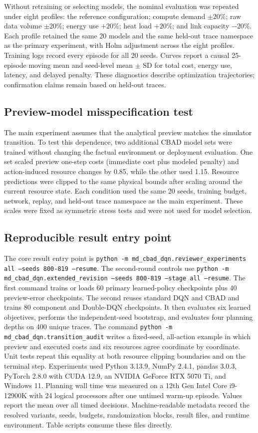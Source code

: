 \documentclass[11pt]{article}
\begin{document}
Without retraining or selecting models, the nominal evaluation was repeated under eight profiles: the reference configuration; compute demand $\pm20\%$; raw data volume $\pm20\%$; energy use $+20\%$; heat load $+20\%$; and link capacity $-20\%$. Each profile retained the same 20 models and the same held-out trace namespace as the primary experiment, with Holm adjustment across the eight profiles. Training logs record every episode for all 20 seeds. Curves report a causal 25-episode moving mean and seed-level mean $\pm$ SD for total cost, energy use, latency, and delayed penalty. These diagnostics describe optimization trajectories; confirmation claims remain based on held-out traces.

\subsection{Preview-model misspecification test}

The main experiment assumes that the analytical preview matches the simulator transition. To test this dependence, two additional CBAD model sets were trained without changing the factual environment or deployment evaluation. One set scaled preview one-step costs (immediate cost plus modeled penalty) and action-induced resource changes by 0.85, while the other used 1.15. Resource predictions were clipped to the same physical bounds after scaling around the current resource state. Each condition used the same 20 seeds, training budget, network, replay, and held-out trace namespace as the main experiment. These scales were fixed as symmetric stress tests and were not used for model selection.

\subsection{Reproducible result entry point}

The core result entry point is \texttt{python -m md\_cbad\_dqn.reviewer\_experiments all --seeds 800-819 --resume}. The second-round controls use \texttt{python -m md\_cbad\_dqn.extended\_revision --seeds 800-819 --stage all --resume}. The first command trains or loads 60 primary learned-policy checkpoints plus 40 preview-error checkpoints. The second reuses standard DQN and CBAD and trains 80 component and Double-DQN checkpoints. It then evaluates six learned objectives, performs the independent-seed bootstrap, and evaluates four planning depths on 400 unique traces. The command \texttt{python -m md\_cbad\_dqn.transition\_audit} writes a fixed-seed, all-action example in which preview and executed costs and six resources agree coordinate by coordinate. Unit tests repeat this equality at both resource clipping boundaries and on the terminal step. Experiments used Python 3.13.9, NumPy 2.4.1, pandas 3.0.3, PyTorch 2.8.0 with CUDA 12.9, an NVIDIA GeForce RTX 5070 Ti, and Windows 11. Planning wall time was measured on a 12th Gen Intel Core i9-12900K with 24 logical processors after one untimed warm-up episode. Values report the mean over all timed decisions. Machine-readable metadata record the resolved variants, seeds, budgets, randomization blocks, result files, and runtime environment. Table scripts consume these files directly.
\end{document}
